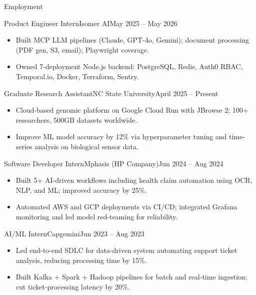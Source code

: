 \documentclass[]{mcdowellcv}
\begin{document}
\makeheader

\begin{cvsection}{Employment}
  \begin{cvsubsection}{Product Engineer Intern}{Isomer AI}{May 2025 -- May 2026}
    \begin{itemize}
      \item Built MCP LLM pipelines (Claude, GPT-4o, Gemini); document processing (PDF gen, S3, email); Playwright coverage.
      \item Owned 7-deployment Node.js backend: PostgreSQL, Redis, Auth0 RBAC, Temporal.io, Docker, Terraform, Sentry.
    \end{itemize}
    \vspace{-1.5pt}
  \end{cvsubsection}

  \begin{cvsubsection}{Graduate Research Assistant}{NC State University}{April 2025 -- Present}
    \begin{itemize}
      \item Cloud-based genomic platform on Google Cloud Run with JBrowse 2; 100+ researchers, 500GB datasets worldwide.
      \item Improve ML model accuracy by 12\% via hyperparameter tuning and time-series analysis on biological sensor data.
    \end{itemize}
    \vspace{-1.5pt}
  \end{cvsubsection}

  \begin{cvsubsection}{Software Developer Intern}{Mphasis (HP Company)}{Jun 2024 -- Aug 2024}
    \begin{itemize}
      \item Built 5+ AI-driven workflows including health claim automation using OCR, NLP, and ML; improved accuracy by 25\%.
      \item Automated AWS and GCP deployments via CI/CD; integrated Grafana monitoring and led model red-teaming for reliability.
    \end{itemize}
    \vspace{-1.5pt}
  \end{cvsubsection}

  \begin{cvsubsection}{AI/ML Intern}{Capgemini}{Jun 2023 -- Aug 2023}
    \begin{itemize}
      \item Led end-to-end SDLC for data-driven system automating support ticket analysis, reducing processing time by 15\%.
      \item Built Kafka + Spark + Hadoop pipelines for batch and real-time ingestion; cut ticket-processing latency by 20\%.
    \end{itemize}
    \vspace{-1.5pt}
  \end{cvsubsection}
\end{cvsection}
\end{document}
